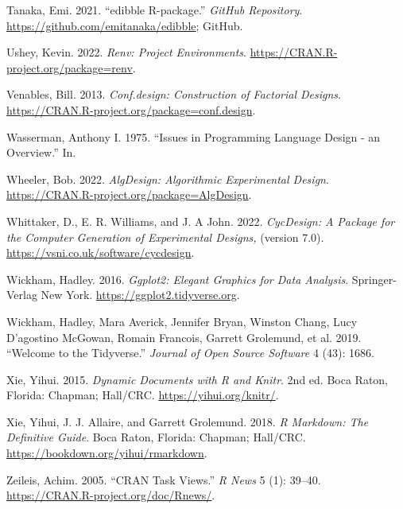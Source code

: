 \begin{CSLReferences}{1}{0}
\leavevmode{}%
Tanaka, Emi. 2021. {``{edibble R-package}.''} \emph{GitHub Repository}. \url{https://github.com/emitanaka/edibble}; GitHub.

\leavevmode{}%
Ushey, Kevin. 2022. \emph{Renv: Project Environments}. \url{https://CRAN.R-project.org/package=renv}.

\leavevmode{}%
Venables, Bill. 2013. \emph{Conf.design: Construction of Factorial Designs}. \url{https://CRAN.R-project.org/package=conf.design}.

\leavevmode{}%
Wasserman, Anthony I. 1975. {``Issues in Programming Language Design - an Overview.''} In.

\leavevmode{}%
Wheeler, Bob. 2022. \emph{AlgDesign: Algorithmic Experimental Design}. \url{https://CRAN.R-project.org/package=AlgDesign}.

\leavevmode{}%
Whittaker, D., E. R. Williams, and J. A John. 2022. \emph{CycDesign: A Package for the Computer Generation of Experimental Designs,} (version 7.0). \url{https://vsni.co.uk/software/cycdesign}.

\leavevmode{}%
Wickham, Hadley. 2016. \emph{Ggplot2: Elegant Graphics for Data Analysis}. Springer-Verlag New York. \url{https://ggplot2.tidyverse.org}.

\leavevmode{}%
Wickham, Hadley, Mara Averick, Jennifer Bryan, Winston Chang, Lucy D'agostino McGowan, Romain Francois, Garrett Grolemund, et al. 2019. {``Welcome to the Tidyverse.''} \emph{Journal of Open Source Software} 4 (43): 1686.

\leavevmode{}%
Xie, Yihui. 2015. \emph{Dynamic Documents with {R} and Knitr}. 2nd ed. Boca Raton, Florida: Chapman; Hall/CRC. \url{https://yihui.org/knitr/}.

\leavevmode{}%
Xie, Yihui, J. J. Allaire, and Garrett Grolemund. 2018. \emph{R Markdown: The Definitive Guide}. Boca Raton, Florida: Chapman; Hall/CRC. \url{https://bookdown.org/yihui/rmarkdown}.

\leavevmode{}%
Zeileis, Achim. 2005. {``{CRAN} Task Views.''} \emph{R News} 5 (1): 39--40. \url{https://CRAN.R-project.org/doc/Rnews/}.


\end{CSLReferences}
